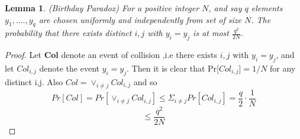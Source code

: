 \documentclass[a4paper,12pt]{report}
\newtheorem{lemma}{Lemma}
\begin{document}
\begin{lemma}
\label{Bday}
(Birthday Paradox) For a positive integer $N$, and say $q$ elements $y_1,....,y_q$  are chosen uniformly and independently from set of size $N$. The probability that there exists distinct $i,j$ with $y_i =y_j$ is at most $\frac{q^2}{2N}$.
\end{lemma}
\begin{proof}
Let \textbf{Col} denote an event of collision ,i.e there exists $i,j$ with $y_i =y_j$, and let \textbf{$Col_{i,j}$} denote the event $y_i =y_j$. Then it is clear that Pr[\textbf{$Col_{i,j}$}]$= 1/N$ for any distinct i,j. Also $Col =  \vee_{i \neq j}Col_{i,j}$ and so $$Pr[Col]=Pr[\vee_{i \neq j}Col_{i,j}] \leq \Sigma_{i \neq j}Pr[Col_{i,j}] = \frac{q}{2}\cdot\frac{1}{N}$$
$$\leq \frac{q^2}{2N}$$
\end{proof}
\end{document}
